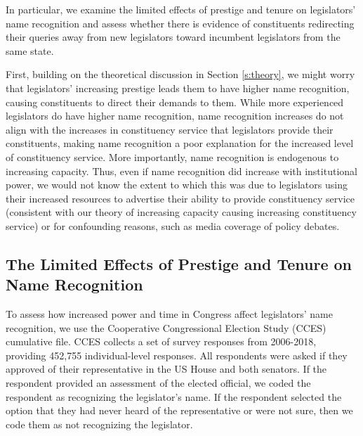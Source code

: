 

In particular, we examine the limited effects of prestige and tenure on legislators' name recognition and assess whether there is evidence of constituents redirecting their queries away from new legislators toward incumbent legislators from the same state. 


First, building on the theoretical discussion in Section \ref{s:theory}, we might worry that legislators' increasing prestige leads them to have higher name recognition, causing constituents to direct their demands to them. %
While more experienced legislators do have higher name recognition, name recognition increases do not align with the increases in constituency service that legislators provide their constituents, making name recognition a poor explanation for the increased level of constituency service. More importantly, name recognition is endogenous to increasing capacity. Thus, even if name recognition did increase with institutional power, we would not know the extent to which this was due to legislators using their increased resources to advertise their ability to provide constituency service (consistent with our theory of increasing capacity causing increasing constituency service) or for confounding reasons, such as media coverage of policy debates. 


\subsection{The Limited Effects of Prestige and Tenure on Name Recognition}
To assess how increased power and time in Congress affect legislators' name recognition, we use the Cooperative Congressional Election Study (CCES) cumulative file. CCES collects a set of survey responses from 2006-2018, providing 452,755 individual-level responses. All respondents were asked if they approved of their representative in the US House and both senators. If the respondent provided an assessment of the elected official, we coded the respondent as recognizing the legislator's name. If the respondent selected the option that they had never heard of the representative or were not sure, then we code them as not recognizing the legislator.


